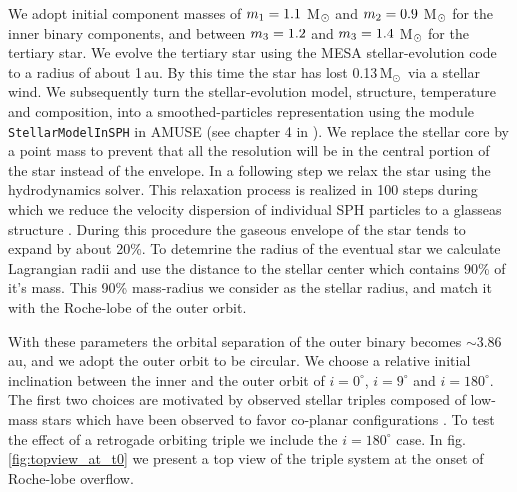 \documentclass{aastex62}
\newcommand{\MSun}{\mbox{M$_\odot$}}
\begin{document}
We adopt initial component masses of $m_{\rm 1} = 1.1$ M$_{\rm \odot}$
and $m_{\rm 2} = 0.9$ M$_{\rm \odot}$ for the inner binary components,
and between $m_{\rm 3} = 1.2$ and $m_{\rm 3} = 1.4$ M$_{\rm \odot}$
for the tertiary star.  We evolve the tertiary star using the MESA
stellar-evolution code \cite{2011ApJS..192....3P} to a radius of about
1\,au.  By this time the star has lost 0.13\,\MSun\, via a stellar
wind.  We subsequently turn the stellar-evolution model, structure,
temperature and composition, into a smoothed-particles representation
using the module {\tt StellarModelInSPH} in AMUSE (see chapter 4 in
\cite{AMUSE}).  We replace the stellar core by a point mass to prevent
that all the resolution will be in the central portion of the star
instead of the envelope. In a following step we relax the star using
the hydrodynamics solver. This relaxation process is realized in 100
steps during which we reduce the velocity dispersion of individual SPH
particles to a glasseas structure \citep[see, for example, \S\,3.3 on
  page 40 in][]{1994astro.ph.10043W}. During this procedure the
gaseous envelope of the star tends to expand by about 20\%.  To
detemrine the radius of the eventual star we calculate Lagrangian
radii and use the distance to the stellar center which contains 90\%
of it's mass. This 90\% mass-radius we consider as the stellar radius,
and match it with the Roche-lobe of the outer orbit.

With these parameters the orbital separation of the outer binary
becomes $\sim 3.86$\,au, and we adopt the outer orbit to be circular.
We choose a relative initial inclination between the inner and the
outer orbit of $i = 0^\circ$, $i = 9^\circ$ and $i = 180^\circ$.  The
first two choices are motivated by observed stellar triples composed
of low-mass stars which have been observed to favor co-planar
configurations \citep{moe18}. To test the effect of a retrogade
orbiting triple we include the $i = 180^\circ$ case.
In fig.\,\ref{fig:topview_at_t0} we present a top view of the triple
system at the onset of Roche-lobe overflow.
\end{document}
